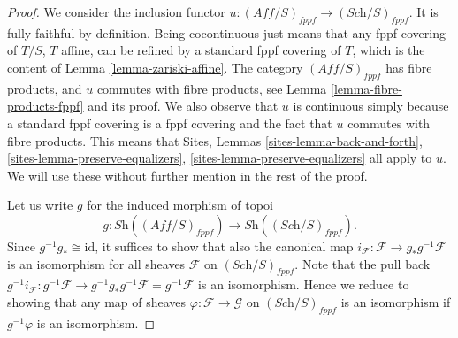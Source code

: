\begin{proof}
We consider the inclusion functor
$u : (\textit{Aff}/S)_{fppf} \to (\textit{Sch}/S)_{fppf}$.
It is fully faithful by definition. Being cocontinuous
just means that any fppf covering of $T/S$, $T$ affine,
can be refined by a standard fppf covering of $T$, which
is the content of Lemma \ref{lemma-zariski-affine}.
The category $(\textit{Aff}/S)_{fppf}$ has fibre products, and $u$ commutes
with fibre products, see Lemma \ref{lemma-fibre-products-fppf}
and its proof.
We also observe that $u$ is continuous
simply because a standard fppf covering is a fppf covering
and the fact that $u$ commutes with fibre products.
This means that
Sites, Lemmas \ref{sites-lemma-back-and-forth},
\ref{sites-lemma-preserve-equalizers},
\ref{sites-lemma-preserve-equalizers} all apply to $u$.
We will use these without further mention in the rest of the proof.

\medskip\noindent
Let us write $g$ for the induced morphism of topoi
$$
g : \textit{Sh}((\textit{Aff}/S)_{fppf}) \longrightarrow
\textit{Sh}((\textit{Sch}/S)_{fppf}).
$$
Since $g^{-1}g_* \cong \text{id}$, it suffices to show that
also the canonical map
$i_{\mathcal{F}} : \mathcal{F} \to g_* g^{-1} \mathcal{F}$
is an isomorphism for all sheaves $\mathcal{F}$ on
$(\textit{Sch}/S)_{fppf}$. Note that the pull back
$g^{-1}i_{\mathcal{F}} : g^{-1} \mathcal{F} \to
g^{-1} g_* g^{-1} \mathcal{F} = g^{-1} \mathcal{F}$
is an isomorphism. Hence we reduce to showing that any
map of sheaves $\varphi : \mathcal{F} \to \mathcal{G}$ on
$(\textit{Sch}/S)_{fppf}$ is an isomorphism if $g^{-1}\varphi$
is an isomorphism.


\end{proof}
